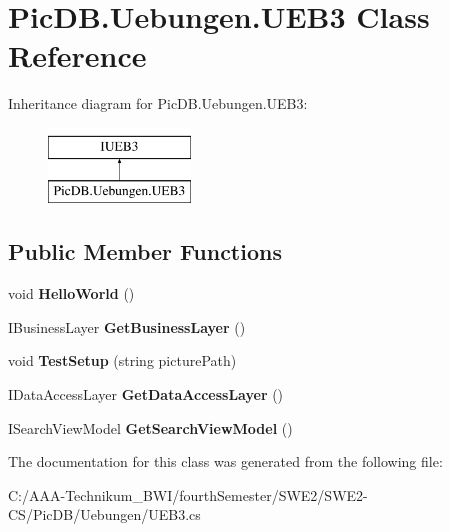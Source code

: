 \hypertarget{class_pic_d_b_1_1_uebungen_1_1_u_e_b3}{}\section{Pic\+D\+B.\+Uebungen.\+U\+E\+B3 Class Reference}
\label{class_pic_d_b_1_1_uebungen_1_1_u_e_b3}
Inheritance diagram for Pic\+D\+B.\+Uebungen.\+U\+E\+B3\+:\begin{figure}[H]
\begin{center}
\leavevmode
\includegraphics[height=2.000000cm]{class_pic_d_b_1_1_uebungen_1_1_u_e_b3}
\end{center}
\end{figure}
\subsection*{Public Member Functions}
\begin{DoxyCompactItemize}
\item 
\mbox{\label{class_pic_d_b_1_1_uebungen_1_1_u_e_b3_acd8a743eeed9a63c337f008a395d1856}} 
void {\bfseries Hello\+World} ()
\item 
\mbox{\label{class_pic_d_b_1_1_uebungen_1_1_u_e_b3_a6da8a75a5d2b2914e9cb07f2e6c702b9}} 
I\+Business\+Layer {\bfseries Get\+Business\+Layer} ()
\item 
\mbox{\label{class_pic_d_b_1_1_uebungen_1_1_u_e_b3_a8a26b28b142543d2145e052e018ac098}} 
void {\bfseries Test\+Setup} (string picture\+Path)
\item 
\mbox{\label{class_pic_d_b_1_1_uebungen_1_1_u_e_b3_a579cfdc62d8e9ebeb9c62102acaaf731}} 
I\+Data\+Access\+Layer {\bfseries Get\+Data\+Access\+Layer} ()
\item 
\mbox{\label{class_pic_d_b_1_1_uebungen_1_1_u_e_b3_a3d58b17cf0c092c9f77508c46dfef731}} 
I\+Search\+View\+Model {\bfseries Get\+Search\+View\+Model} ()
\end{DoxyCompactItemize}


The documentation for this class was generated from the following file\+:\begin{DoxyCompactItemize}
\item 
C\+:/\+A\+A\+A-\/\+Technikum\+\_\+\+B\+W\+I/fourth\+Semester/\+S\+W\+E2/\+S\+W\+E2-\/\+C\+S/\+Pic\+D\+B/\+Uebungen/U\+E\+B3.\+cs\end{DoxyCompactItemize}
